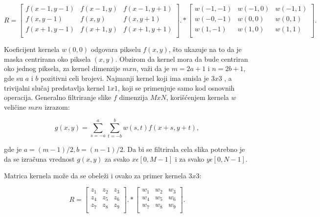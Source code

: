 \documentclass[a4paper,12pt,titlepage]{article}
\begin{document}
\begin{equation}\label{eq:conv2}
R
=
\begin{bmatrix}
f(x - 1, y - 1) & f(x - 1, y) & f(x - 1, y + 1) \\
f(x, y - 1) & f(x , y) & f(x, y + 1) \\
f(x + 1, y - 1) & f(x + 1, y) & f(x + 1, y + 1) \\
\end{bmatrix}
.*
\begin{bmatrix}
w(- 1, - 1) & w(- 1, 0) & w(- 1, 1) \\
w(-0, - 1) & w(0, 0) & w(0, 1) \\
w(1, - 1) & w(1, 0) & w(1, 1) \\
\end{bmatrix}
.\end{equation}

Koeficijent kernela $w(0, 0)$ odgovara pikselu $f(x, y)$, što ukazuje na to da je maska centrirana oko piksela $(x, y)$. Obzirom da kernel mora da bude centriran oko jednog piksela, za kernel dimenzije $m x n$, važi da je $m = 2a + 1$ i $n = 2b + 1$, gde su $a$ i $b$ pozitivni celi brojevi. Najmanji kernel koji ima smisla je $3 x 3$ , a trivijalni slučaj predstavlja kernel $1 x 1$, koji se primenjuje samo kod osnovnih operacija. Generalno filtriranje slike $f$ dimenzija $M x N$, korišćenjem kernela $w$ veličine $m x n$ izrazom:

\begin{equation}\label{eq:conv3}
g(x, y) = \sum_{s = -a}^{a} \sum_{t = -b}^{b} w(s, t) f(x + s, y + t),
\end{equation}

gde je $a = (m - 1) / 2, b = (n - 1) / 2$. Da bi se filtrirala cela slika potrebno je da se izračuna vrednost $g(x, y)$ za svako $x \epsilon [0, M - 1]$ i za svako $y \epsilon [0, N - 1]$. 

Matrica kernela može da se obeleži i ovako za primer kernela $3 x 3$:

\begin{equation}\label{eq:conv4}
R
=
\begin{bmatrix}
z_{1} & z_{2} & z_{3} \\
z_{4} & z_{5} & z_{6} \\
z_{7} & z_{8} & z_{9} \\
\end{bmatrix}
.*
\begin{bmatrix}
w_{1} & w_{2} & w_{3} \\
w_{4} & w_{5} & w_{6} \\
w_{7} & w_{8} & w_{9} \\
\end{bmatrix}
.\end{equation}
\end{document}
